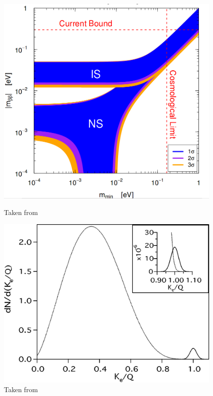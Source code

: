 \documentclass[encoding=utf8,british]{tumphthesis}
\begin{document}
\begin{figure}[t!]
	\centering
	\begin{minipage}{.419249532\textwidth}
		\centering
		\includegraphics[width=\textwidth]{./Bilder/NeutrinoMassOrdering.png}
		\caption{Taken from \cite{bilenky_neutrinoless_2012}}
		\label{fig:MassOrder}
	\end{minipage}%
	\begin{minipage}{.5\textwidth}
		\centering
		\includegraphics[width=\textwidth]{./Bilder/TheoretischesSpektrmdes0nubbDecay.png}
		\caption{Taken from \cite{elliott_double_2002}}
		\label{fig:TheoSpektrum}
	\end{minipage}
\end{figure}
\end{document}
